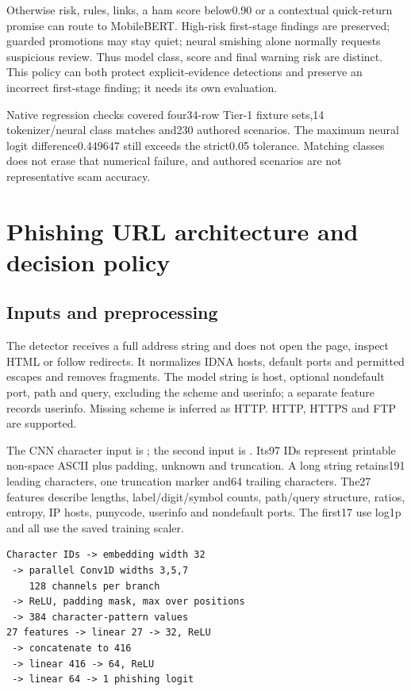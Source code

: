 Otherwise risk, rules, links, a ham score below0.90 or a contextual quick-return promise can route to MobileBERT. High-risk first-stage findings are preserved; guarded promotions may stay quiet; neural smishing alone normally requests suspicious review. Thus model class, score and final warning risk are distinct. This policy can both protect explicit-evidence detections and preserve an incorrect first-stage finding; it needs its own evaluation.

Native regression checks covered four34-row Tier-1 fixture sets,14 tokenizer/neural class matches and230 authored scenarios. The maximum neural logit difference0.449647 still exceeds the strict0.05 tolerance. Matching classes does not erase that numerical failure, and authored scenarios are not representative scam accuracy.

\chapter{Phishing URL architecture and decision policy}
\section{Inputs and preprocessing}
The detector receives a full address string and does not open the page, inspect HTML or follow redirects. It normalizes IDNA hosts, default ports and permitted escapes and removes fragments. The model string is host, optional nondefault port, path and query, excluding the scheme and userinfo; a separate feature records userinfo. Missing scheme is inferred as HTTP. HTTP, HTTPS and FTP are supported.

The CNN character input is ; the second input is . Its97 IDs represent printable non-space ASCII plus padding, unknown and truncation. A long string retains191 leading characters, one truncation marker and64 trailing characters. The27 features describe lengths, label/digit/symbol counts, path/query structure, ratios, entropy, IP hosts, punycode, userinfo and nondefault ports. The first17 use log1p and all use the saved training scaler.

\begin{lstlisting}
Character IDs -> embedding width 32
 -> parallel Conv1D widths 3,5,7
    128 channels per branch
 -> ReLU, padding mask, max over positions
 -> 384 character-pattern values
27 features -> linear 27 -> 32, ReLU
 -> concatenate to 416
 -> linear 416 -> 64, ReLU
 -> linear 64 -> 1 phishing logit
\end{lstlisting}

